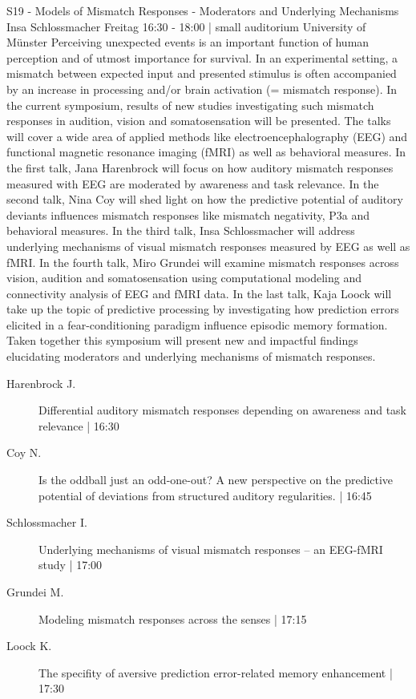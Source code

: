 
            \begin{symposium}
            {S19 - Models of Mismatch Responses - Moderators and Underlying Mechanisms}
            {Insa Schlossmacher}
            {Freitag 16:30 - 18:00 | small auditorium}
            {University of Münster}
            Perceiving unexpected events is an important function of human perception and of utmost importance for survival. In an experimental setting, a mismatch between expected input and presented stimulus is often accompanied by an increase in processing and/or brain activation (= mismatch response). In the current symposium, results of new studies investigating such mismatch responses in audition, vision and somatosensation will be presented. The talks will cover a wide area of applied methods like electroencephalography (EEG) and functional magnetic resonance imaging (fMRI) as well as behavioral measures. In the first talk, Jana Harenbrock will focus on how auditory mismatch responses measured with EEG are moderated by awareness and task relevance. In the second talk, Nina Coy will shed light on how the predictive potential of auditory deviants influences mismatch responses like mismatch negativity, P3a and behavioral measures. In the third talk, Insa Schlossmacher will address underlying mechanisms of visual mismatch responses measured by EEG as well as fMRI. In the fourth talk, Miro Grundei will examine mismatch responses across vision, audition and somatosensation using computational modeling and connectivity analysis of EEG and fMRI data. In the last talk, Kaja Loock will take up the topic of predictive processing by investigating how prediction errors elicited in a fear-conditioning paradigm influence episodic memory formation. Taken together this symposium will present new and impactful findings elucidating moderators and underlying mechanisms of mismatch responses.
            \begin{description}    
            
                \item [ Harenbrock J.] Differential auditory mismatch responses depending on awareness and task relevance \textcolor{mygray}{ | 16:30}    
                
                \item [ Coy N.] Is the oddball just an odd-one-out? A new perspective on the predictive potential of deviations from structured auditory regularities. \textcolor{mygray}{ | 16:45}    
                
                \item [ Schlossmacher I.] Underlying mechanisms of visual mismatch responses – an EEG-fMRI study \textcolor{mygray}{ | 17:00}    
                
                \item [ Grundei M.] Modeling mismatch responses across the senses \textcolor{mygray}{ | 17:15}    
                
                \item [ Loock K.] The specifity of aversive prediction error-related memory enhancement \textcolor{mygray}{ | 17:30}    
                
            \end{description} 
            \end{symposium}
            